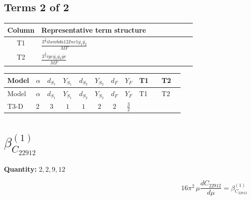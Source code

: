 \documentclass[8pt]{article}
\begin{document}
\begin{landscape}
\subsection*{Terms 2 of 2}
\begin{center}
\begin{tabular}{@{}c >{\raggedright\arraybackslash}p{0.82\linewidth}@{}}
\toprule
Column & Representative term structure \\
\midrule
T1 & \(\displaystyle \frac{3^{\frac{3}{4}} i lambda12Inv1 \overline{y_{1}} \overline{y_{2}}}{MF}\) \\
\midrule
T2 & \(\displaystyle \frac{3^{\frac{3}{4}} i ye \overline{y_{1}} \overline{y_{2}} \overline{ye}}{MF}\) \\
\midrule
\bottomrule
\end{tabular}
\end{center}
\smallskip
\tiny
\begin{longtable}{@{}llcccccc >{\raggedright\arraybackslash}p{0.21\linewidth} >{\raggedright\arraybackslash}p{0.21\linewidth}@{}}
\toprule
Model & $\alpha$ & $d_{S_1}$ & $Y_{S_1}$ & $d_{S_2}$ & $Y_{S_2}$ & $d_F$ & $Y_F$ & T1 & T2 \\
\midrule
\endfirsthead
\toprule
Model & $\alpha$ & $d_{S_1}$ & $Y_{S_1}$ & $d_{S_2}$ & $Y_{S_2}$ & $d_F$ & $Y_F$ & T1 & T2 \\
\midrule
\endhead
T3-D & $2$ & $3$ & $1$ & $1$ & $2$ & $2$ & $\frac{3}{2}$ & \scriptsize\adjustbox{max width=\linewidth}{$\begin{gathered} - \frac{3^{\frac{3}{4}} i lambda12Inv1 \overline{y_{1}} \overline{y_{2}}}{6 MF}\end{gathered}$} & \scriptsize\adjustbox{max width=\linewidth}{$\begin{gathered} \frac{3^{\frac{3}{4}} i ye \overline{y_{1}} \overline{y_{2}} \overline{ye}}{12 MF}\end{gathered}$} \\
\midrule
\bottomrule
\end{longtable}
\clearpage
\section*{$\beta_{C_{22912}}^{(1)}$}
\noindent\textbf{Quantity: }$\mathrm{2,2,9,12}$\par\smallskip
\[16\pi^2\,\mu\frac{d C_{22912}}{d\mu}=\beta_{C_{22912}}^{(1)}\]

\end{landscape}
\end{document}
